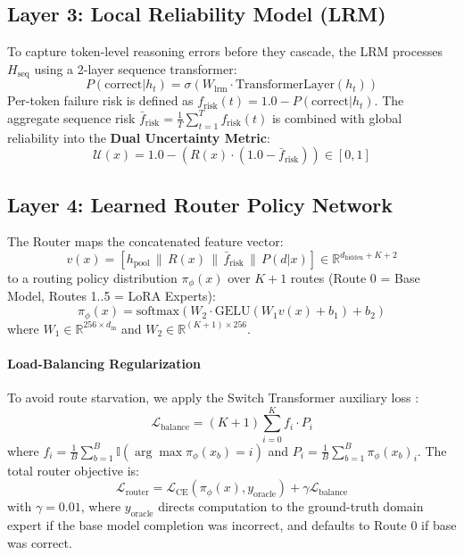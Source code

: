 \documentclass[journal,10pt,twocolumn]{IEEEtran}
\begin{document}
\subsection{Layer 3: Local Reliability Model (LRM)}
To capture token-level reasoning errors before they cascade, the LRM processes $H_{\text{seq}}$ using a 2-layer sequence transformer:
\begin{equation}
P(\text{correct} | h_t) = \sigma(W_{\text{lrm}} \cdot \text{TransformerLayer}(h_t))
\end{equation}
Per-token failure risk is defined as $f_{\text{risk}}(t) = 1.0 - P(\text{correct} | h_t)$. The aggregate sequence risk $\bar{f}_{\text{risk}} = \frac{1}{T} \sum_{t=1}^T f_{\text{risk}}(t)$ is combined with global reliability into the \textbf{Dual Uncertainty Metric}:
\begin{equation}
\mathcal{U}(x) = 1.0 - \left( R(x) \cdot (1.0 - \bar{f}_{\text{risk}}) \right) \in [0, 1]
\end{equation}

\subsection{Layer 4: Learned Router Policy Network}
The Router maps the concatenated feature vector:
\begin{equation}
v(x) = \left[ h_{\text{pool}} \,\|\, R(x) \,\|\, \bar{f}_{\text{risk}} \,\|\, P(d|x) \right] \in \mathbb{R}^{d_{\text{hidden}} + K + 2}
\end{equation}
to a routing policy distribution $\pi_\phi(x)$ over $K+1$ routes (Route 0 = Base Model, Routes 1..5 = LoRA Experts):
\begin{equation}
\pi_\phi(x) = \text{softmax}\left( W_2 \cdot \text{GELU}(W_1 v(x) + b_1) + b_2 \right)
\end{equation}
where $W_1 \in \mathbb{R}^{256 \times d_{\text{in}}}$ and $W_2 \in \mathbb{R}^{(K+1) \times 256}$.

\paragraph{Load-Balancing Regularization}
To avoid route starvation, we apply the Switch Transformer auxiliary loss \cite{fedus2022switch}:
\begin{equation}
\mathcal{L}_{\text{balance}} = (K+1) \sum_{i=0}^K f_i \cdot P_i
\end{equation}
where $f_i = \frac{1}{B} \sum_{b=1}^B \mathbb{I}(\arg\max \pi_\phi(x_b) = i)$ and $P_i = \frac{1}{B} \sum_{b=1}^B \pi_\phi(x_b)_i$. The total router objective is:
\begin{equation}
\mathcal{L}_{\text{router}} = \mathcal{L}_{\text{CE}}(\pi_\phi(x), y_{\text{oracle}}) + \gamma \mathcal{L}_{\text{balance}}
\end{equation}
with $\gamma = 0.01$, where $y_{\text{oracle}}$ directs computation to the ground-truth domain expert if the base model completion was incorrect, and defaults to Route 0 if base was correct.
\end{document}
